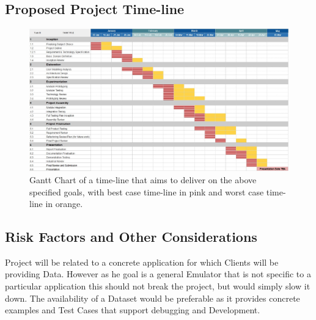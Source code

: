 \documentclass{article}
\begin{document}
  \subsection{Proposed Project Time-line}

    \begin{figure}[h]
      \centering
      \includegraphics[width=\linewidth]{figures/ProjectPlan.jpg}
      \caption{Gantt Chart of a time-line that aims to deliver on the above specified goals, with best case time-line in pink and worst case time-line in orange.
      }
      \label{fig:gantt}
    \end{figure}

  \subsection{Risk Factors and Other Considerations}

Project will be related to a concrete application for which Clients will be providing Data. However as he goal is a general Emulator that is not specific to a particular application this should not break the project, but would simply slow it down. The availability of a Dataset would be preferable as it provides concrete examples and Test Cases that support debugging and Development.
  









\clearpage

\end{document}
